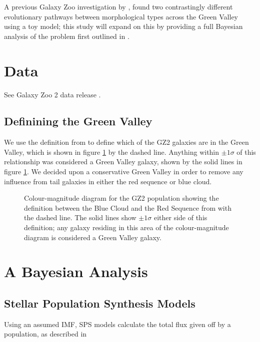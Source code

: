 \documentclass{mn2e}
\begin{document}
A previous Galaxy Zoo investigation by  \cite{Sch2014}, found two contrastingly different evolutionary pathways between morphological types across the Green Valley using a toy model; this study will expand on this by providing a full Bayesian analysis of the problem first outlined in \cite{Sch2014}. 
\section{Data}
See Galaxy Zoo 2 data release \cite{GZ2}.
\subsection{Definining the Green Valley}
We use the definition from \citet{Baldry} to define which of the GZ2 galaxies are in the Green Valley, which is shown in figure \ref{CMGV} by the dashed line. Anything within $\pm 1\sigma$ of this relationship was considered a Green Valley galaxy, shown by the solid lines in figure \ref{CMGV}. We decided upon a conservative Green Valley in order to remove any influence from tail galaxies in either the red sequence or blue cloud.

\begin{figure}
\caption{Colour-magnitude diagram for the GZ2 population showing the definition between the Blue Cloud and the Red Sequence from \citet{Baldry} with the dashed line. The solid lines show $\pm 1\sigma$ either side of this definition; any galaxy residing in this area of the colour-magnitude diagram is considered a Green Valley galaxy.}
\label{CMGV}
\end{figure}

\section{A Bayesian Analysis}
\subsection{Stellar Population Synthesis Models}
Using an assumed IMF, SPS models calculate the total flux given off by a population, as described in \cite{BC03}
\end{document}
